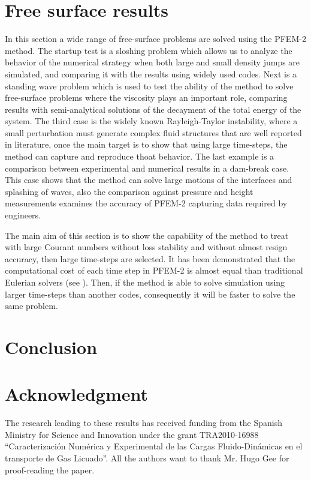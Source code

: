 \documentclass[review]{elsarticle}
\begin{document}
\section{Free surface results}\label{FS_results}


In this section a wide range of free-surface problems are solved using the PFEM-2 method. The startup test is a sloshing problem which allows us to analyze the behavior of the numerical strategy when both large and small density jumps are simulated, and comparing it with the results using widely used codes. Next is a standing wave problem which is used to test the ability of the method to solve free-surface problems where the viscosity plays an important role, comparing results with semi-analytical solutions of the decayment of the total energy of the system. The third case is the widely known Rayleigh-Taylor instability, where a small perturbation must generate complex fluid structures that are well reported in literature, once the main target is to show that using large time-steps, the method can capture and reproduce thoat behavior. The last example is a comparison between experimental and numerical results in a dam-break case. This case shows that the method can solve large motions of the interfaces and splashing of waves, also the comparison against pressure and height measurements examines the accuracy of PFEM-2 capturing data required by engineers. 

The main aim of this section is to show the capability of the method to treat with large Courant numbers without loss stability and without almost resign accuracy, then large time-steps are selected. It has been demonstrated that the computational cost of each time step in PFEM-2 is almost equal than traditional Eulerian solvers (see \cite{Idelsohn12b}). Then, if the method is able to solve simulation using larger time-steps than another codes, consequently it will be faster to solve the same problem.











\section{Conclusion}



\section*{Acknowledgment}
The research  leading  to these results has received funding from the Spanish Ministry for Science and
 Innovation under the grant TRA2010-16988
``Caracterizaci\'on Num\'erica y Experimental de las Cargas Fluido-Din\'amicas en el transporte de Gas Licuado''.
All the authors want to thank Mr. Hugo Gee for proof-reading the paper.
\end{document}

